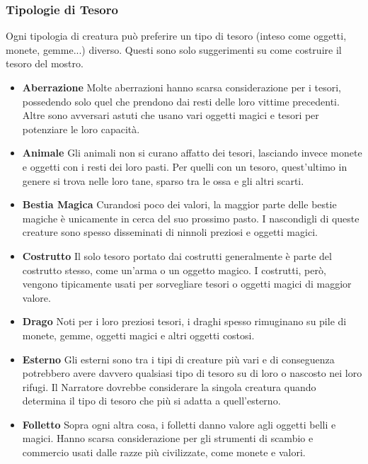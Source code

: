 \begin{multicols}{2}
\subsubsection{Tipologie di Tesoro}

Ogni tipologia di creatura può preferire un tipo di tesoro (inteso come oggetti, monete, gemme...) diverso. Questi sono solo suggerimenti su come costruire il tesoro del mostro.

\medskip

\begin{itemize}

\item \textbf{Aberrazione}
Molte aberrazioni hanno scarsa considerazione per i tesori, possedendo solo quel che prendono dai resti delle loro vittime precedenti. Altre sono avversari astuti che usano vari oggetti magici e tesori per potenziare le loro capacità.

\item \textbf{Animale}
Gli animali non si curano affatto dei tesori, lasciando invece monete e oggetti con i resti dei loro pasti. Per quelli con un tesoro, quest'ultimo in genere si trova nelle loro tane, sparso tra le ossa e gli altri scarti.

\item \textbf{Bestia Magica}
Curandosi poco dei valori, la maggior parte delle bestie magiche è unicamente in cerca del suo prossimo pasto. I nascondigli di queste creature sono spesso disseminati di ninnoli preziosi e oggetti magici.

\item \textbf{Costrutto}
Il solo tesoro portato dai costrutti generalmente è parte del costrutto stesso, come un'arma o un oggetto magico. I costrutti, però, vengono tipicamente usati per sorvegliare tesori o oggetti magici di maggior valore.

\item \textbf{Drago}
Noti per i loro preziosi tesori, i draghi spesso rimuginano su pile di monete, gemme, oggetti magici e altri oggetti costosi.

\item \textbf{Esterno}
Gli esterni sono tra i tipi di creature più vari e di conseguenza potrebbero avere davvero qualsiasi tipo di tesoro su di loro o nascosto nei loro rifugi. Il Narratore dovrebbe considerare la singola creatura quando determina il tipo di tesoro che più si adatta a quell'esterno.

\item \textbf{Folletto}
Sopra ogni altra cosa, i folletti danno valore agli oggetti belli e magici. Hanno scarsa considerazione per gli strumenti di scambio e commercio usati dalle razze più civilizzate, come monete e valori.


\end{itemize}
\end{multicols}
